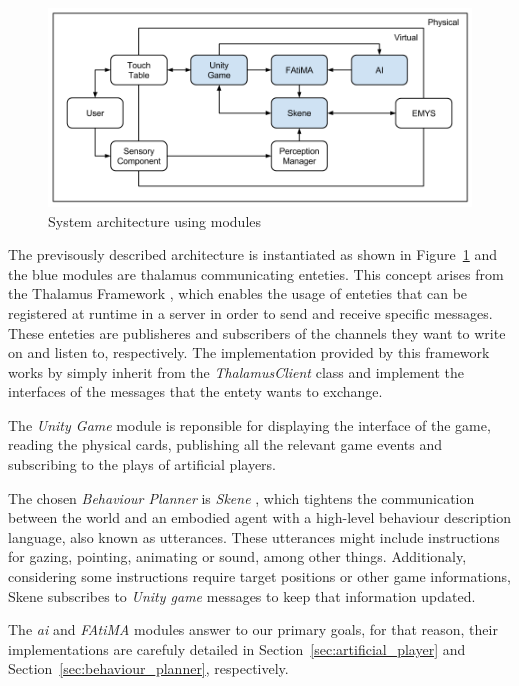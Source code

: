 \begin{figure}[ht]
  \centering
    \includegraphics[width=1\textwidth]{./img/model}
  \caption{System architecture using modules}
\label{fig:model}
\end{figure}

The previsously described architecture is instantiated as shown in Figure~\ref{fig:model} and the blue modules are thalamus communicating enteties.
This concept arises from the Thalamus Framework \cite{Ribeiro}, which enables the usage of enteties that can be registered at runtime in a server in order to send and receive specific messages.
These enteties are publisheres and subscribers of the channels they want to write on and listen to, respectively.
The implementation provided by this framework works by simply inherit from the \emph{ThalamusClient} class and implement the interfaces of the messages that the entety wants to exchange.

The \emph{Unity Game} module is reponsible for displaying the interface of the game, reading the physical cards, publishing all the relevant game events and subscribing to the plays of artificial players.

The chosen \emph{Behaviour Planner} is \emph{Skene} \cite{Ribeiroa}, which tightens the communication between the world and an embodied agent with a high-level behaviour description language, also known as utterances.
These utterances might include instructions for gazing, pointing, animating or sound, among other things.
Additionaly, considering some instructions require target positions or other game informations, Skene subscribes to \emph{Unity game} messages to keep that information updated.

The \emph{\ac{ai}} and \emph{FAtiMA} modules answer to our primary goals, for that reason, their implementations are carefuly detailed in Section~\ref{sec:artificial_player} and Section~\ref{sec:behaviour_planner}, respectively.
